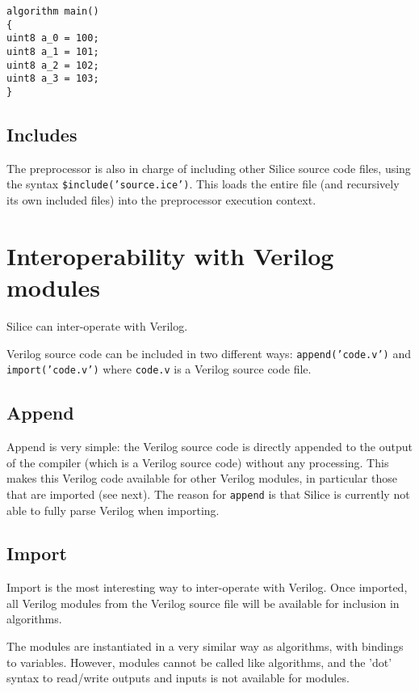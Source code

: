 \documentclass[a4]{article}
\newcommand\verilog{Verilog}
\newcommand\silice{Silice}
\begin{document}
\begin{verbatim}
algorithm main()
{
uint8 a_0 = 100;
uint8 a_1 = 101;
uint8 a_2 = 102;
uint8 a_3 = 103;
}
\end{verbatim}


\subsection{Includes}

The preprocessor is also in charge of including other Silice source code files,
using the syntax \texttt{\$include('source.ice')}. This loads the entire file
(and recursively its own included files) into the preprocessor execution context.


\section{Interoperability with \verilog{} modules}

\silice{} can inter-operate with \verilog{}.

\verilog{} source code can be included in two different ways: \texttt{append('code.v')} and \texttt{import('code.v')} where \texttt{code.v} is a \verilog{} source code file.

\subsection{Append}

Append is very simple: the \verilog{} source code is directly appended to the output of the compiler (which is a \verilog{} source code) without any processing. This makes this \verilog{} code available for other \verilog{} modules, in particular those that are imported (see next). The reason for \texttt{append} is that \silice{} is currently not able to fully parse \verilog{} when importing. 

\subsection{Import}

Import is the most interesting way to inter-operate with \verilog{}.
Once imported, all \verilog{} modules from the \verilog{} source file 
will be available for inclusion in algorithms.

The modules are instantiated in a very similar way as algorithms, with bindings to variables. However, modules cannot be called like algorithms, and the 'dot' syntax to read/write outputs and inputs is not available for modules.
\end{document}
